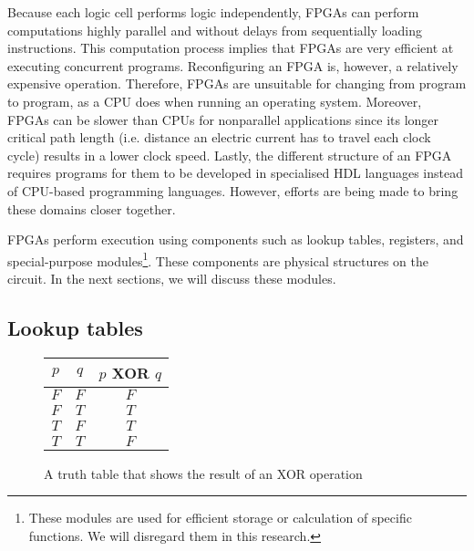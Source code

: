 Because each logic cell performs logic independently, FPGAs can perform computations highly parallel and without delays from sequentially loading instructions. This computation process implies that FPGAs are very efficient at executing concurrent programs. Reconfiguring an FPGA is, however, a relatively expensive operation. Therefore, FPGAs are unsuitable for changing from program to program, as a CPU does when running an operating system. Moreover, FPGAs can be slower than CPUs for nonparallel applications since its longer critical path length (i.e. distance an electric current has to travel each clock cycle) results in a lower clock speed. Lastly, the different structure of an FPGA requires programs for them to be developed in specialised HDL languages instead of CPU-based programming languages. However, efforts are being made to bring these domains closer together.

FPGAs perform execution using components such as lookup tables, registers, and special-purpose modules\footnote{These modules are used for efficient storage or calculation of specific functions. We will disregard them in this research.}. These components are physical structures on the circuit. In the next sections, we will discuss these modules.
\subsection{Lookup tables}


\begin{figure}
\centering
\begin{tabular}{|c|c|c|}
\hline
$p$ & $q$ & $p$ XOR $q$ \\ \hline
$F$ & $F$ & $F$       \\ \hline
$F$ & $T$ & $T$       \\ \hline
$T$ & $F$ & $T$       \\ \hline
$T$ & $T$ & $F$       \\ \hline
\end{tabular}
\caption{A truth table that shows the result of an XOR operation}
\label{fig:truth_table}
\end{figure}

